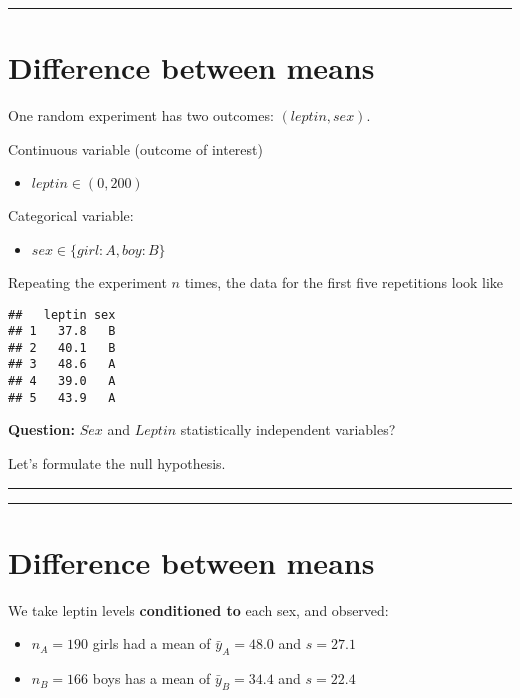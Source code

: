 \documentclass[
]{book}
\providecommand{\tightlist}{%
  \setlength{\itemsep}{0pt}\setlength{\parskip}{0pt}}
\begin{document}
\begin{center}\rule{0.5\linewidth}{0.5pt}\end{center}

\hypertarget{difference-between-means-2}{%
\section{Difference between means}\label{difference-between-means-2}}

One random experiment has two outcomes: \((leptin, sex)\).

Continuous variable (outcome of interest)

\begin{itemize}
\tightlist
\item
  \(leptin \in (0, 200)\)
\end{itemize}

Categorical variable:

\begin{itemize}
\tightlist
\item
  \(sex \in \{girl:A,boy:B\}\)
\end{itemize}

Repeating the experiment \(n\) times, the data for the first five repetitions look like

\begin{verbatim}
##   leptin sex
## 1   37.8   B
## 2   40.1   B
## 3   48.6   A
## 4   39.0   A
## 5   43.9   A
\end{verbatim}

\textbf{Question:} \(Sex\) and \(Leptin\) statistically independent variables?

Let's formulate the null hypothesis.

\begin{center}\rule{0.5\linewidth}{0.5pt}\end{center}

\begin{center}\rule{0.5\linewidth}{0.5pt}\end{center}

\hypertarget{difference-between-means-3}{%
\section{Difference between means}\label{difference-between-means-3}}

We take leptin levels \textbf{conditioned to} each sex, and observed:

\begin{itemize}
\item
  \(n_A=190\) girls had a mean of \(\bar{y}_A=48.0\) and \(s=27.1\)
\item
  \(n_B=166\) boys has a mean of \(\bar{y}_B=34.4\) and \(s=22.4\)
\end{itemize}
\end{document}
